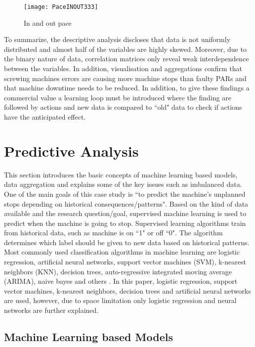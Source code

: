 \documentclass[runningheads]{llncs}
\begin{document}
\begin{figure}
\centering
\texttt{[image: PaceINOUT333]} 
\caption{In and out pace}
\label{fig:pace}
\end{figure}

To summarize, the descriptive analysis discloses that data is not uniformly distributed and almost half of the variables are highly skewed. Moreover, due to the binary nature of data, correlation matrices only reveal weak interdependence between the variables. In addition, visualisation and aggregations confirm that screwing machines errors are causing more machine stops than faulty PARs and that machine downtime needs to be reduced. In addition, to give these findings a commercial value a learning loop must be introduced where the finding are followed by actions and new data is compared to ``old" data to check if actions have the anticipated effect.
  


 

\section {Predictive Analysis}
\label{sec:modeling}
This section introduces the basic concepts of machine learning based models, data aggregation and explains some of the key issues such as imbalanced data. One of the main goals of this case study is ``to predict the machine's unplanned stops depending on historical consequences/patterns". Based on the kind of data available and the research question/goal, supervised machine learning is used to predict when the machine is going to stop. Supervised learning algorithms train from historical data, such as machine is on ``1" or off ``0".  The algorithm determines which label should be given to new data based on historical patterns. Most commonly used classification algorithms in machine learning are logistic regression, artificial neural networks, support vector machines (SVM), k-nearest neighbors (KNN), decision trees, auto-regressive integrated moving average (ARIMA), naive bayes and others \cite{gooijer}. In this paper, logistic regression, support vector machines, k-nearest neighbors, decision trees and artificial neural networks are used, however, due to space limitation only logistic regression and neural networks are further explained.


\subsection {Machine Learning based Models}
\end{document}

